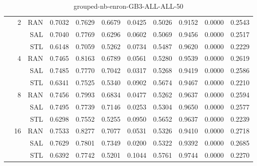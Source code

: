 \begin{center}
\begin{table}[htbp]
\begin{tabular}{ | r | r | r | r | r | r | r | r | r | r | r |}
 & \multirow{3}{*}{2} & RAN & 0.7032 & 0.7629 & 0.6679 & 0.0425 & 0.5026 & 0.9152 & 0.0000 & 0.2543\\ \cline{3-11}
 &   & SAL & 0.7040 & 0.7769 & 0.6296 & 0.0602 & 0.5069 & 0.9456 & 0.0000 & 0.2517\\ \cline{3-11}
 &   & STL & 0.6148 & 0.7059 & 0.5262 & 0.0734 & 0.5487 & 0.9620 & 0.0000 & 0.2229\\ \cline{2-11}
 & \multirow{3}{*}{4} & RAN & 0.7465 & 0.8163 & 0.6789 & 0.0561 & 0.5280 & 0.9539 & 0.0000 & 0.2619\\ \cline{3-11}
 &   & SAL & 0.7485 & 0.7770 & 0.7042 & 0.0317 & 0.5268 & 0.9419 & 0.0000 & 0.2586\\ \cline{3-11}
 &   & STL & 0.6341 & 0.7525 & 0.5340 & 0.0902 & 0.5674 & 0.9467 & 0.0000 & 0.2210\\ \cline{2-11}
 & \multirow{3}{*}{8} & RAN & 0.7456 & 0.7993 & 0.6834 & 0.0477 & 0.5262 & 0.9637 & 0.0000 & 0.2594\\ \cline{3-11}
 &   & SAL & 0.7495 & 0.7739 & 0.7146 & 0.0253 & 0.5304 & 0.9650 & 0.0000 & 0.2577\\ \cline{3-11}
 &   & STL & 0.6298 & 0.7552 & 0.5255 & 0.0950 & 0.5652 & 0.9637 & 0.0000 & 0.2239\\ \cline{2-11}
 & \multirow{3}{*}{16} & RAN & 0.7533 & 0.8277 & 0.7077 & 0.0531 & 0.5326 & 0.9410 & 0.0000 & 0.2718\\ \cline{3-11}
 &   & SAL & 0.7629 & 0.7801 & 0.7349 & 0.0200 & 0.5322 & 0.9392 & 0.0000 & 0.2685\\ \cline{3-11}
 &   & STL & 0.6392 & 0.7742 & 0.5201 & 0.1044 & 0.5761 & 0.9744 & 0.0000 & 0.2270\\ \cline{2-11}
\hline
\end{tabular}
\caption{grouped-nb-enron-GB3-ALL-ALL-50}
\end{table}
\end{center}

